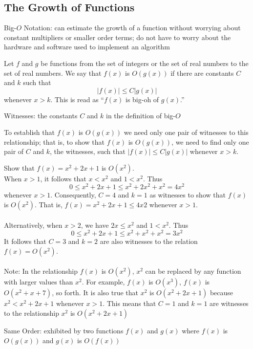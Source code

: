 \documentclass[12pt]{article}
\begin{document}
\subsection{The Growth of Functions}
\begin{definition} Big-$O$ Notation: can estimate the growth of a function without worrying about constant multipliers or smaller order terms; do not have to worry about the hardware and software used to implement an algorithm \end{definition} 
\begin{definition} Let $f$ and $g$ be functions from the set of integers or the set of real numbers to the set of real numbers. We say that $f(x)$ is $O(g(x))$ if there are constants $C$ and $k$ such that $$|f(x)| \leq C|g(x)|$$ whenever $x > k$. This is read as ``$f(x)$ is big-oh of $g(x)$.'' \end{definition} 
\begin{definition} Witnesses: the constants $C$ and $k$ in the definition of big-$O$ \end{definition} 
To establish that $f(x)$ is $O(g(x))$ we need only one pair of witnesses to this relationship; that is, to show that $f(x)$ is $O(g(x))$, we need to find only one pair of $C$ and $k$, the witnesses, such that $|f(x)| \leq C|g(x)|$ whenever $x > k$. 
\begin{example} Show that $f(x) = x^2 + 2x + 1$ is $O(x^2)$. \\ 
When $x > 1$, it follows that $x < x^2$ and $1 < x^2$. Thus $$0 \leq x^2 + 2x + 1 \leq x^2 + 2x^2 + x^2 = 4x^2$$ whenever $x > 1$. Consequently, $C = 4$ and $k = 1$ as witnesses to show that $f(x)$ is $O(x^2)$. That is, $f(x) = x^2 + 2x + 1 \leq 4x2$ whenever $x > 1$. \\~\\
Alternatively, when $x > 2$, we have $2x \leq x^2$ and $1 < x^2$. Thus $$ 0 \leq x^2 + 2x + 1 \leq x^2 + x^2 + x^2 = 3x^2$$ It follows that $C = 3$ and $k = 2$ are also witnesses to the relation $f(x) = O(x^2)$. \\~\\
Note: In the relationship $f(x)$ is $O(x^2)$, $x^2$ can be replaced by any function with larger values than $x^2$. For example, $f(x)$ is $O(x^3)$, $f(x)$ is $O(x^2 + x + 7)$, so forth. It is also true that $x^2$ is $O(x^2 + 2x + 1)$ because $x^2 < x^2 + 2x + 1$ whenever $x > 1$. This means that $C = 1$ and $k = 1$ are witnesses to the relationship $x^2$ is $O(x^2 + 2x + 1)$  \end{example}
\begin{definition} Same Order: exhibited by two functions $f(x)$ and $g(x)$ where $f(x)$ is $O(g(x))$ and $g(x)$ is $O(f(x))$ \end{definition} 
\end{document}
